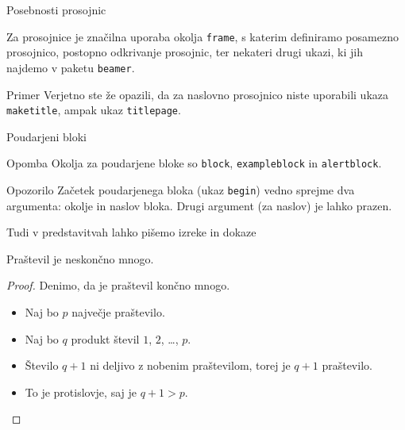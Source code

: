 \begin{frame}{Posebnosti prosojnic}

	Za prosojnice je značilna uporaba okolja \texttt{frame},
	s katerim definiramo posamezno prosojnico,
	\pause
	postopno odkrivanje prosojnic,
	\pause
	ter nekateri drugi ukazi, ki jih najdemo v paketu \texttt{beamer}.
	\pause
	\begin{exampleblock}{Primer}
		Verjetno ste že opazili, da za naslovno prosojnico niste uporabili
		ukaza \texttt{maketitle}, ampak ukaz \texttt{titlepage}.
	\end{exampleblock}
\end{frame}

\begin{frame}{Poudarjeni bloki}

		
		\begin{block}{Opomba}
			Okolja za poudarjene bloke so \texttt{block}, \texttt{exampleblock} in \texttt{alertblock}.
		\end{block}

		\begin{alertblock}{Opozorilo}
			Začetek poudarjenega bloka (ukaz \texttt{begin}) vedno sprejme 
			dva argumenta: okolje in naslov bloka.
			Drugi argument (za naslov) je lahko prazen. 
		\end{alertblock}

\end{frame}

\begin{frame}{Tudi v predstavitvah lahko pišemo izreke in dokaze}

	\begin{izrek}
	   Praštevil je neskončno mnogo.
	\end{izrek}
	\begin{proof}
	   Denimo, da je praštevil končno mnogo.
	   \begin{itemize}[<+->]
		  \item Naj bo \(p\) \alert<4->{največje} praštevilo.
		  \item Naj bo \(q\) produkt števil \(1\), \(2\), \ldots, \(p\).
		  \item Število \(q+1\) ni deljivo z nobenim praštevilom, torej je \(q+1\) praštevilo.
		  \item To je protislovje, saj je \(q+1>p\). \qedhere
	   \end{itemize}
	\end{proof}
 \end{frame}
 
